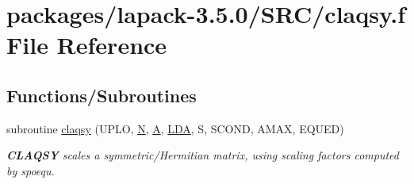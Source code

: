 \hypertarget{claqsy_8f}{}\section{packages/lapack-\/3.5.0/\+S\+R\+C/claqsy.f File Reference}
\label{claqsy_8f}
\subsection*{Functions/\+Subroutines}
\begin{DoxyCompactItemize}
\item 
subroutine \hyperlink{group__complexSYauxiliary_gab12daf202264e97ef334a0d8125497b8}{claqsy} (U\+P\+L\+O, \hyperlink{polmisc_8c_a0240ac851181b84ac374872dc5434ee4}{N}, \hyperlink{classA}{A}, \hyperlink{example__user_8c_ae946da542ce0db94dced19b2ecefd1aa}{L\+D\+A}, S, S\+C\+O\+N\+D, A\+M\+A\+X, E\+Q\+U\+E\+D)
\begin{DoxyCompactList}\small\item\em {\bfseries C\+L\+A\+Q\+S\+Y} scales a symmetric/\+Hermitian matrix, using scaling factors computed by spoequ. \end{DoxyCompactList}\end{DoxyCompactItemize}
